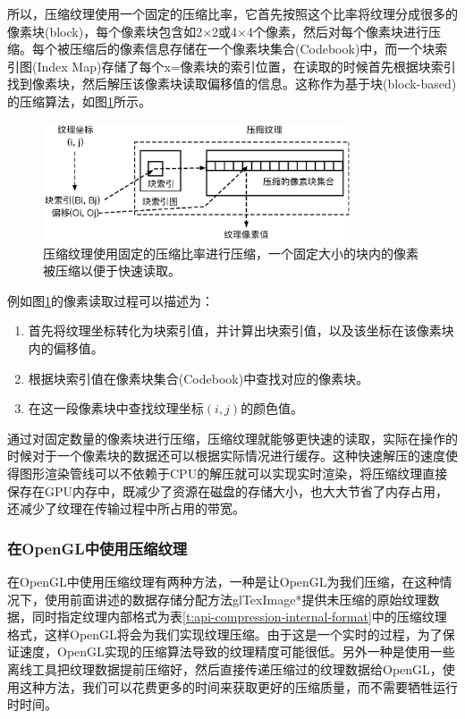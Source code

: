 所以，压缩纹理使用一个固定的压缩比率，它首先按照这个比率将纹理分成很多的像素块(block)，每个像素块包含如2$\times$2或4$\times$4个像素，然后对每个像素块进行压缩。每个被压缩后的像素信息存储在一个像素块集合(Codebook)中，而一个块索引图(Index Map)存储了每个x=像素块的索引位置，在读取的时候首先根据块索引找到像素块，然后解压该像素块读取偏移值的信息。这称作为基于块(block-based)的压缩算法，如图\ref{f:api-compression}所示。

\begin{figure}
\begin{center}
\includegraphics[width=0.81\textwidth]{figures/api/compression}
\end{center}
	\caption{压缩纹理使用固定的压缩比率进行压缩，一个固定大小的块内的像素被压缩以便于快速读取。}
	\label{f:api-compression}
\end{figure}

例如图\ref{f:api-compression}的像素读取过程可以描述为：

\begin{enumerate}
	\item 首先将纹理坐标转化为块索引值，并计算出块索引值，以及该坐标在该像素块内的偏移值。
	\item 根据块索引值在像素块集合(Codebook)中查找对应的像素块。
	\item 在这一段像素块中查找纹理坐标$(i,j)$的颜色值。
\end{enumerate}

通过对固定数量的像素块进行压缩，压缩纹理就能够更快速的读取，实际在操作的时候对于一个像素块的数据还可以根据实际情况进行缓存。这种快速解压的速度使得图形渲染管线可以不依赖于CPU的解压就可以实现实时渲染，将压缩纹理直接保存在GPU内存中，既减少了资源在磁盘的存储大小，也大大节省了内存占用，还减少了纹理在传输过程中所占用的带宽。





\subsubsection{在OpenGL中使用压缩纹理}
在OpenGL中使用压缩纹理有两种方法，一种是让OpenGL为我们压缩，在这种情况下，使用前面讲述的数据存储分配方法glTexImage*提供未压缩的原始纹理数据，同时指定纹理内部格式为表\ref{t:api-compression-internal-format}中的压缩纹理格式，这样OpenGL将会为我们实现纹理压缩。由于这是一个实时的过程，为了保证速度，OpenGL实现的压缩算法导致的纹理精度可能很低。另外一种是使用一些离线工具把纹理数据提前压缩好，然后直接传递压缩过的纹理数据给OpenGL，使用这种方法，我们可以花费更多的时间来获取更好的压缩质量，而不需要牺牲运行时时间。

